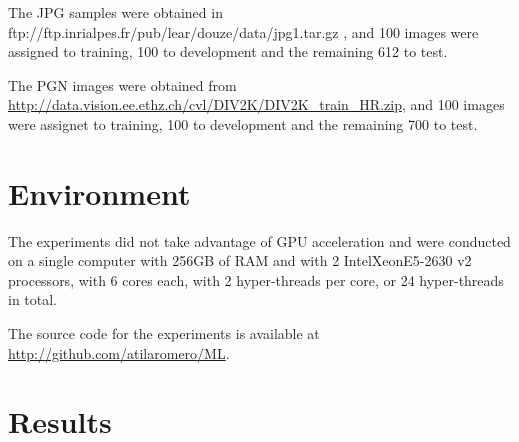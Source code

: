 The JPG samples were obtained in ftp://ftp.inrialpes.fr/pub/lear/douze/data/jpg1.tar.gz , and 100 images were assigned to training, 100 to development and the remaining 612 to test.

The PGN images were obtained from \url{http://data.vision.ee.ethz.ch/cvl/DIV2K/DIV2K_train_HR.zip}, and 100 images were assignet to training, 100 to development and the remaining 700 to test.


\section{Environment}
The experiments did not take advantage of GPU acceleration and were  conducted on a single computer with 256GB of RAM and with 2 Intel\textregistered Xeon\textregistered E5-2630 v2 processors, with 6 cores each, with 2 hyper-threads per core, or 24 hyper-threads in total. 

The source code for the experiments is available at \url{http://github.com/atilaromero/ML}.

\section{Results}



